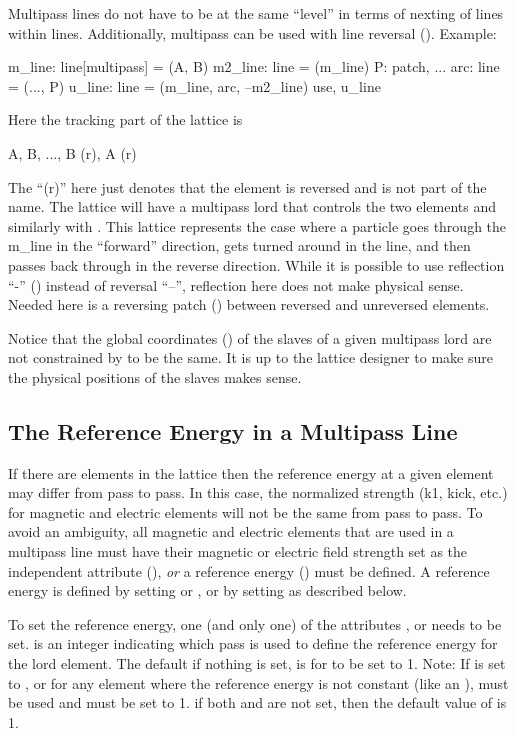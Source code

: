 Multipass lines do not have to be at the same ``level'' in terms of
nexting of lines within lines. Additionally, multipass can be used with line reversal
(). Example:
\begin{example}
  m_line: line[multipass] = (A, B)
  m2_line: line = (m_line)
  P: patch, ...
  arc: line = (..., P)
  u_line: line = (m_line, arc, --m2_line)
  use, u_line
\end{example}
Here the tracking part of the lattice is
\begin{example}
  A, B, ..., B (r), A (r)
\end{example}
The ``(r)'' here just denotes that the element is reversed and is not
part of the name. The lattice will have a multipass lord  that
controls the two  elements and similarly with . This
lattice represents the case where a particle goes through the m_line
in the ``forward'' direction, gets turned around in the  line,
and then passes back through  in the reverse direction.
While it is possible to use reflection ``-'' ()
instead of reversal ``--'', reflection here does not make physical
sense.  Needed here is a reversing patch  ()
between reversed and unreversed elements.

Notice that the global coordinates () of the slaves of
a given multipass lord are not constrained by \bmad to be the same. It
is up to the lattice designer to make sure the physical positions of
the slaves makes sense.

\subsection{The Reference Energy in a Multipass Line}
\label{s:ref.e.multi}

If there are  elements in the lattice then the reference
energy at a given element may differ from pass to pass. In this case,
the normalized strength (k1, kick, etc.) for magnetic and electric
elements will not be the same from pass to pass. To avoid an
ambiguity, all magnetic and electric elements that are used in a
multipass line must have their magnetic or electric field strength set
as the independent attribute (), {\em or} a reference
energy () must be defined. A reference energy is
defined by setting  or , or by setting
 as described below. 

To set the reference energy, one (and only one) of the attributes
,  or  needs to be
set.  is an integer indicating which pass is used to
define the reference energy for the lord element. The default if
nothing is set, is for  to be set to 1.  Note: If
 is set to , or for any element
where the reference energy is not constant (like an ),
 must be used and must be set to 1. if both 
and  are not set, then the default value of 
is 1.

